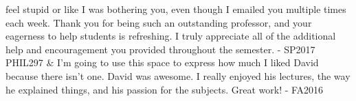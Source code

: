 \documentclass[p1noheader, 11pt, lightmode]{lightcv}
\begin{document}
\begin{dated}
    feel stupid or like I was bothering you, even though I emailed you multiple times each week. Thank you for being such an outstanding professor, and your eagerness to help
    students is refreshing. I truly appreciate all of the additional help and encouragement you provided throughout the semester. - SP2017\\
    PHIL297 & I’m going to use this space to express how much I liked David because there isn’t one. David was awesome. I really enjoyed his lectures, the way he explained
    things, and his passion for the subjects. Great work! - FA2016
\end{dated}
\end{document}
